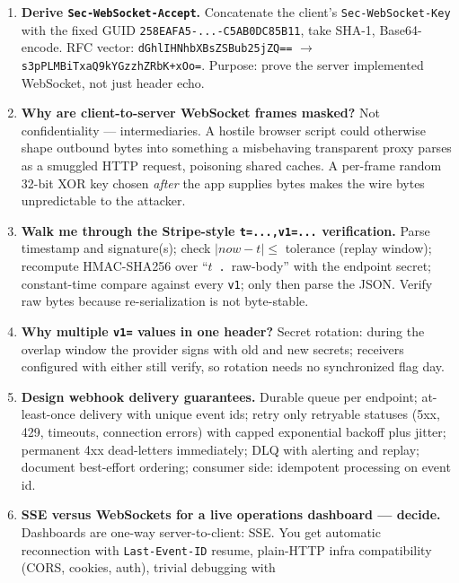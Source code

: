 \begin{enumerate}[label=\textbf{Q\arabic*.}, leftmargin=1.6cm, start=11]
  \item \textbf{Derive \texttt{Sec-WebSocket-Accept}.}
        Concatenate the client's \texttt{Sec-WebSocket-Key} with the fixed
        GUID \texttt{258EAFA5-...-C5AB0DC85B11}, take SHA-1, Base64-encode.
        RFC vector: \texttt{dGhlIHNhbXBsZSBub25jZQ==} $\rightarrow$
        \texttt{s3pPLMBiTxaQ9kYGzzhZRbK+xOo=}. Purpose: prove the server
        implemented WebSocket, not just header echo.
  \item \textbf{Why are client-to-server WebSocket frames masked?}
        Not confidentiality --- intermediaries. A hostile browser script
        could otherwise shape outbound bytes into something a misbehaving
        transparent proxy parses as a smuggled HTTP request, poisoning shared
        caches. A per-frame random 32-bit XOR key chosen \emph{after} the
        app supplies bytes makes the wire bytes unpredictable to the
        attacker.
  \item \textbf{Walk me through the Stripe-style \texttt{t=...,v1=...}
        verification.}
        Parse timestamp and signature(s); check $|now - t| \le$ tolerance
        (replay window); recompute HMAC-SHA256 over
        ``$t$~\texttt{.}~raw-body'' with the endpoint secret; constant-time
        compare against every \texttt{v1}; only then parse the JSON. Verify
        raw bytes because re-serialization is not byte-stable.
  \item \textbf{Why multiple \texttt{v1=} values in one header?}
        Secret rotation: during the overlap window the provider signs with
        old and new secrets; receivers configured with either still verify,
        so rotation needs no synchronized flag day.
  \item \textbf{Design webhook delivery guarantees.}
        Durable queue per endpoint; at-least-once delivery with unique event
        ids; retry only retryable statuses (5xx, 429, timeouts, connection
        errors) with capped exponential backoff plus jitter; permanent 4xx
        dead-letters immediately; DLQ with alerting and replay; document
        best-effort ordering; consumer side: idempotent processing on event
        id.
  \item \textbf{SSE versus WebSockets for a live operations dashboard ---
        decide.}
        Dashboards are one-way server-to-client: SSE. You get automatic
        reconnection with \texttt{Last-Event-ID} resume, plain-HTTP infra
        compatibility (CORS, cookies, auth), trivial debugging with

\end{enumerate}
